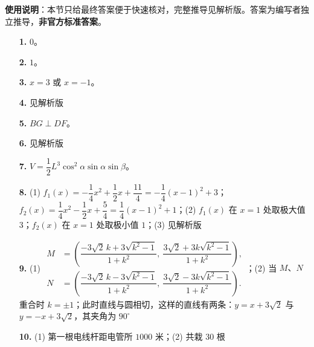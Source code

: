 
\begin{gknotice}
\textbf{使用说明}：本节只给最终答案便于快速核对，完整推导见解析版。答案为编写者独立推导，\textbf{非官方标准答案}。
\end{gknotice}

\begin{itemize}[leftmargin=2.6em]
  \item[\textbf{1.}] $0$。
  \item[\textbf{2.}] $1$。
  \item[\textbf{3.}] $x=3$ 或 $x=-1$。
  \item[\textbf{4.}] 见解析版
  \item[\textbf{5.}] $BG\perp DF$。
  \item[\textbf{6.}] 见解析版
  \item[\textbf{7.}] $V=\dfrac12L^3\cos^2\alpha\sin\alpha\sin\beta$。
  \item[\textbf{8.}] (1) $f_1(x)=-\dfrac14x^2+\dfrac12x+\dfrac{11}{4}=-\dfrac14(x-1)^2+3$；$f_2(x)=\dfrac14x^2-\dfrac12x+\dfrac54=\dfrac14(x-1)^2+1$；(2) $f_1(x)$ 在 $x=1$ 处取极大值 $3$；$f_2(x)$ 在 $x=1$ 处取极小值 $1$；(3) 见解析版
  \item[\textbf{9.}] (1) $\begin{aligned}M&=\left(\dfrac{-3\sqrt2\,k+3\sqrt{k^2-1}}{1+k^2},\ \dfrac{3\sqrt2+3k\sqrt{k^2-1}}{1+k^2}\right),\\ N&=\left(\dfrac{-3\sqrt2\,k-3\sqrt{k^2-1}}{1+k^2},\ \dfrac{3\sqrt2-3k\sqrt{k^2-1}}{1+k^2}\right).\end{aligned}$；(2) 当 $M\text{、}N$ 重合时 $k=\pm1$；此时直线与圆相切，这样的直线有两条：$y=x+3\sqrt2$ 与 $y=-x+3\sqrt2$，其夹角为 $90^\circ$
  \item[\textbf{10.}] (1) 第一根电线杆距电管所 $1000$ 米；(2) 共栽 $30$ 根
\end{itemize}
